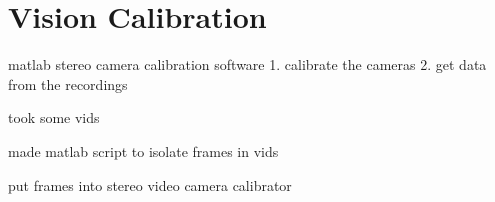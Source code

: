 \section{Vision Calibration}


matlab stereo camera calibration software
1. calibrate the cameras
2. get data from the recordings

took some vids

made matlab script to isolate frames in vids

put frames into stereo video camera calibrator



